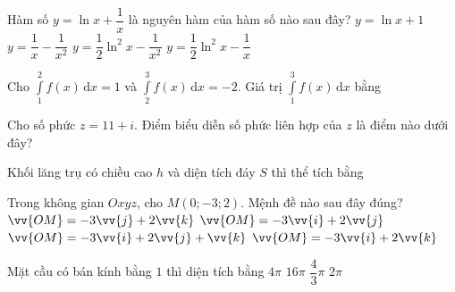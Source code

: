 \documentclass[12pt,a4paper,oneside]{book}
\def\vec{\vv}
\begin{document}
\begin{ex}%
Hàm số $ y=\ln x + \dfrac{1}{x} $ là nguyên hàm của hàm số nào sau đây?
\choice
{$ y = \ln x + 1 $}
{\True $ y = \dfrac{1}{x} - \dfrac{1}{x^2} $}
{$ y = \dfrac{1}{2} \ln^2 x - \dfrac{1}{x^2} $}
{$ y = \dfrac{1}{2} \ln^2 x - \dfrac{1}{x} $}
\end{ex}

\begin{ex}%
Cho $ \displaystyle\int\limits_{1}^{2}f(x)\mathrm{\,d}x = 1 $ và $ \displaystyle\int\limits_{2}^{3}f(x)\mathrm{\,d}x = -2 $. Giá trị $ \displaystyle\int\limits_{1}^{3}f(x)\mathrm{\,d}x $ bằng
\end{ex}

\begin{ex}%
Cho số phức $ z=11+i $. Điểm biểu diễn số phức liên hợp của $ z $ là điểm nào dưới đây?
\end{ex}

\begin{ex}%
Khối lăng trụ có chiều cao $ h $ và diện tích đáy $ S $ thì thể tích bằng
\end{ex}

\begin{ex}%
Trong không gian $ Oxyz $, cho $ M(0;-3;2) $. Mệnh đề nào sau đây đúng?
\choice
{\True$ \vec{OM}=-3\vec{j}+2\vec{k} $}
{$ \vec{OM}=-3\vec{i}+2\vec{j} $}
{$ \vec{OM}=-3\vec{i}+2\vec{j}+\vec{k} $}
{$ \vec{OM}=-3\vec{i}+2\vec{k} $}
\loigiai{
Ta có $ M(0;-3;2) \Rightarrow \vec{OM}=0\vec{i}-3\vec{j}+2\vec{k} = -3\vec{j}+2\vec{k}  $.
}\end{ex}

\begin{ex}%
	Mặt cầu có bán kính bằng $1$ thì diện tích bằng
	\choice
	{\True $4\pi$}
	{$16\pi$}
	{$\dfrac{4}{3}\pi$}
	{$2\pi$}
\end{ex}
\end{document}
